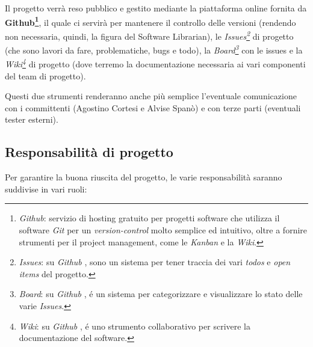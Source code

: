 \documentclass{article}
\begin{document}
Il progetto verrà reso pubblico e gestito mediante la piattaforma online
fornita da \textbf{Github\footnote{\emph{Github}: servizio di hosting
gratuito per progetti software che utilizza il software \emph{Git} per
un \emph{version-control} molto semplice ed intuitivo, oltre a fornire
strumenti per il project management, come le \emph{Kanban} e la
\emph{Wiki}.}}, il quale ci servirà per mantenere il
controllo delle versioni (rendendo non necessaria, quindi, la figura del
Software Librarian), le \emph{Issues\footnote{\emph{Issues}: su
\emph{Github} , sono un sistema per tener traccia dei vari
\emph{todos} e \emph{open items} del progetto.}} di progetto (che sono
lavori da fare, problematiche, bugs e todo), la \emph{Board\footnote{\emph{Board}:
su \emph{Github} , é un sistema per categorizzare e
visualizzare lo stato delle varie \emph{Issues}.}} con le
issues e la \emph{Wiki\footnote{\emph{Wiki}: su \emph{Github}
, é uno strumento collaborativo per scrivere la documentazione del
software.}} di progetto (dove terremo la documentazione necessaria ai
vari componenti del team di progetto).

Questi due strumenti renderanno anche più semplice l'eventuale comunicazione con i committenti (Agostino Cortesi e Alvise Spanò) e con terze parti (eventuali tester esterni).

\subsection{Responsabilità di
progetto}

Per garantire la buona riuscita del progetto, le varie responsabilità
saranno suddivise in vari ruoli:
\end{document}
